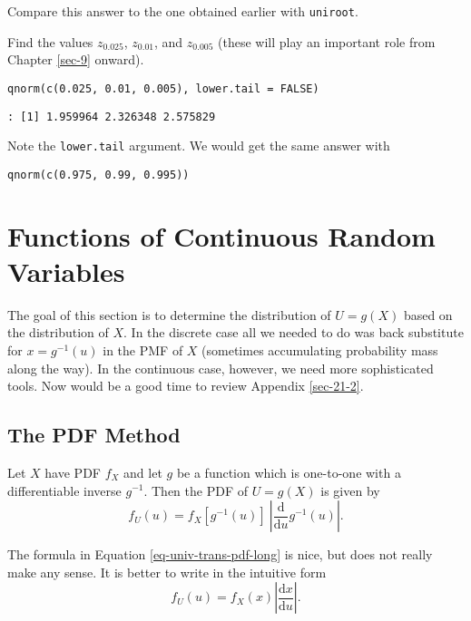 Compare this answer to the one obtained earlier with \texttt{uniroot}.



Find the values \(z_{0.025}\), \(z_{0.01}\), and \(z_{0.005}\) (these
will play an important role from Chapter \ref{sec-9} onward).


\begin{verbatim}
qnorm(c(0.025, 0.01, 0.005), lower.tail = FALSE)
\end{verbatim}

\begin{verbatim}
: [1] 1.959964 2.326348 2.575829
\end{verbatim}

Note the \texttt{lower.tail} argument. We would get the same answer with
\begin{verbatim}
qnorm(c(0.975, 0.99, 0.995))
\end{verbatim}

\section{Functions of Continuous Random Variables}
\label{sec-6-4}

The goal of this section is to determine the distribution of
\(U=g(X)\) based on the distribution of \(X\). In the discrete case
all we needed to do was back substitute for \(x=g^{-1}(u)\) in the PMF
of \(X\) (sometimes accumulating probability mass along the way). In
the continuous case, however, we need more sophisticated tools. Now
would be a good time to review Appendix \ref{sec-21-2}.

\subsection{The PDF Method}
\label{sec-6-4-1}

\begin{prop}
\label{pro-func-cont-rvs-pdf-formula} Let \(X\) have PDF \(f_{X}\) and let
\(g\) be a function which is one-to-one with a differentiable inverse
\(g^{-1}\). Then the PDF of \(U=g(X)\) is given by
\begin{equation}
\label{eq-univ-trans-pdf-long}
f_{U}(u)=f_{X}\left[g^{-1}(u)\right]\ \left|\frac{\mathrm{d}}{\mathrm{d} u}g^{-1}(u)\right|.
\end{equation}
\end{prop}

\begin{rem}
The formula in Equation \eqref{eq-univ-trans-pdf-long} is nice, but does not
really make any sense. It is better to write in the intuitive form
\begin{equation}
\label{eq-univ-trans-pdf-short}
f_{U}(u)=f_{X}(x)\left|\frac{\mathrm{d} x}{\mathrm{d} u}\right|.
\end{equation}
\end{rem}


